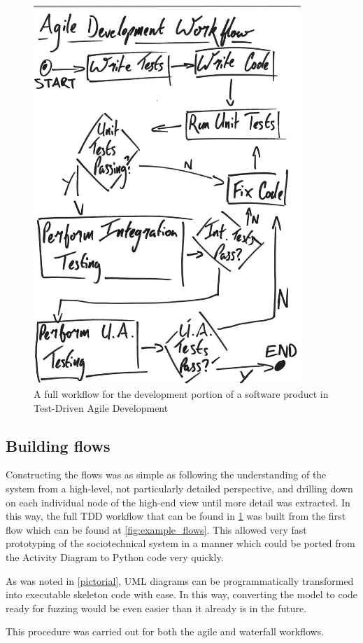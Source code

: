\begin{figure}[p]
    \centering
    \includegraphics[width=0.9\textwidth]{images/Example_agile_flows.pdf}
    \caption{A full workflow for the development portion of a software product in Test-Driven Agile Development}
    \label{fig:agile_workflow}
\end{figure}

\subsection{Building flows}
Constructing the flows was as simple as following the understanding of the system from a high-level, not particularly detailed perspective, and drilling down on each individual node of the high-end view until more detail was extracted. In this way, the full TDD workflow that can be found in \cref{fig:agile_workflow} was built from the first flow which can be found at \cref{fig:example_flows}. This allowed very fast prototyping of the sociotechnical system in a manner which could be ported from the Activity Diagram to Python code very quickly. \par
As was noted in \cref{pictorial}, UML diagrams can be programmatically transformed into executable skeleton code with ease. In this way, converting the model to code ready for fuzzing would be even easier than it already is in the future. \par
This procedure was carried out for both the agile and waterfall workflows. 

